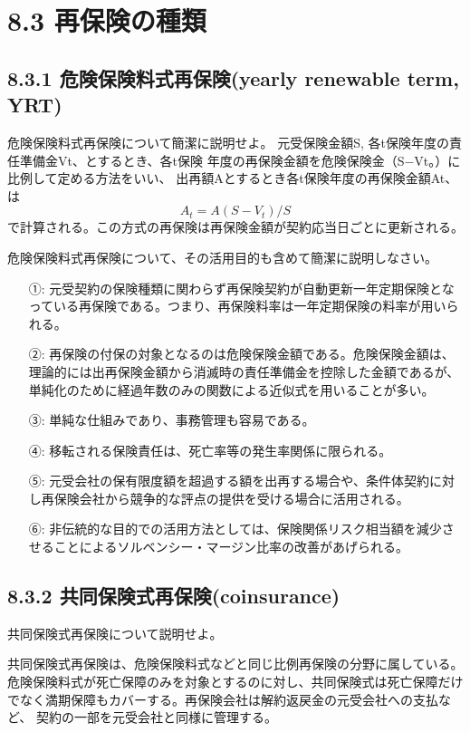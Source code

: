 \documentclass[report,gutter=10mm,fore-edge=10mm,uplatex,dvipdfmx]{jlreq}
\begin{document}
\section{8.3 再保険の種類}
\subsection{8.3.1 危険保険料式再保険(yearly renewable term, YRT)}
危険保険料式再保険について簡潔に説明せよ。
\answer{}
元受保険金額S, 各t保険年度の責任準備金Vt、とするとき、各t保険
年度の再保険金額を危険保険金（S−Vt。）に比例して定める方法をいい、
出再額Aとするとき各t保険年度の再保険金額At、は
$$
A_t=A(S−V_t)/S
$$
で計算される。この方式の再保険は再保険金額が契約応当日ごとに更新される。

危険保険料式再保険について、その活用目的も含めて簡潔に説明しなさい。
\answer{}
\begin{itemize}
\item[ ①: ] 元受契約の保険種類に関わらず再保険契約が自動更新一年定期保険となっている再保険である。つまり、再保険料率は一年定期保険の料率が用いられる。
\item[ ②: ] 再保険の付保の対象となるのは危険保険金額である。危険保険金額は、理論的には出再保険金額から消滅時の責任準備金を控除した金額であるが、単純化のために経過年数のみの関数による近似式を用いることが多い。
\item[ ③: ] 単純な仕組みであり、事務管理も容易である。
\item[ ④: ] 移転される保険責任は、死亡率等の発生率関係に限られる。
\item[ ⑤: ] 元受会社の保有限度額を超過する額を出再する場合や、条件体契約に対し再保険会社から競争的な評点の提供を受ける場合に活用される。
\item[ ⑥: ] 非伝統的な目的での活用方法としては、保険関係リスク相当額を減少させることによるソルベンシー・マージン比率の改善があげられる。
\end{itemize}

\subsection{8.3.2 共同保険式再保険(coinsurance)}
共同保険式再保険について説明せよ。
\answer{}

共同保険式再保険は、危険保険料式などと同じ比例再保険の分野に属している。
危険保険料式が死亡保障のみを対象とするのに対し、共同保険式は死亡保障だけ
でなく満期保障もカバーする。再保険会社は解約返戻金の元受会社への支払など、
契約の一部を元受会社と同様に管理する。
\end{document}
